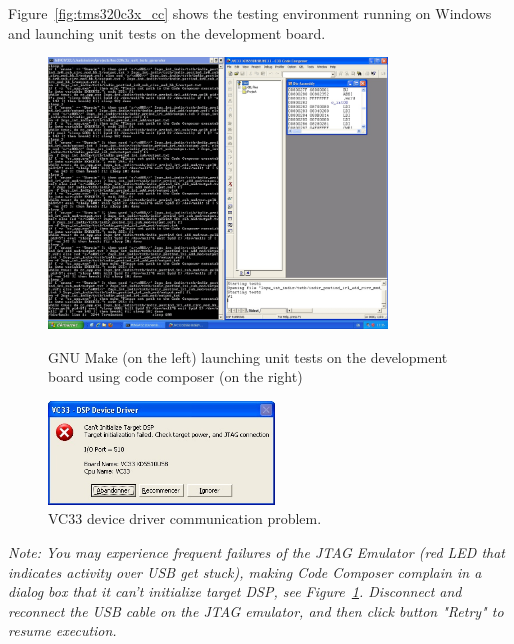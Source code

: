 Figure~\ref{fig:tms320c3x_cc} shows the testing environment running on Windows and launching unit tests on the development board.

\begin{figure}[!h]
	\begin{center}
		\begin{minipage}{\textwidth}
			\begin{minipage}{9.5cm}
				\begin{center}
					\includegraphics[width=9.0cm]{tms320c3x/fig_code_composer.jpg}
					\caption{\label{fig:tms320c3x_cc} GNU Make (on the left) launching unit tests on the development board using code composer (on the right)}
				\end{center}
			\end{minipage}
			\begin{minipage}{6.5cm}
				\begin{center}
		\includegraphics[width=6.0cm]{tms320c3x/fig_driver_error.jpg}
		\caption{\label{fig:tms320c3x_driver_error} VC33 device driver communication problem.}
				\end{center}
			\end{minipage}
		\end{minipage}
	\end{center}
\end{figure}

\textit{Note: You may experience frequent failures of the JTAG Emulator (red LED that indicates activity over USB get stuck), making Code Composer complain in a dialog box that it can't initialize target DSP, see Figure~\ref{fig:tms320c3x_driver_error}. Disconnect and reconnect the USB cable on the JTAG emulator, and then click button "Retry" to resume execution.}

